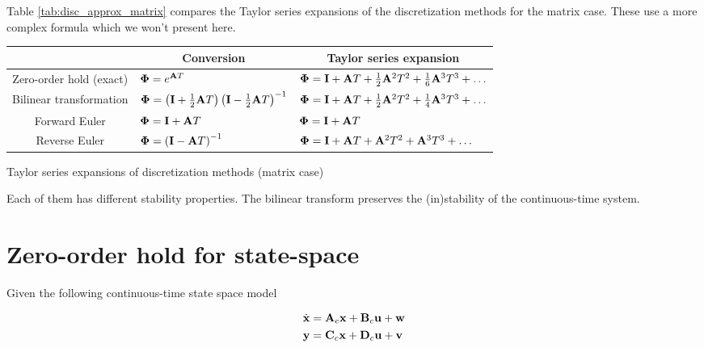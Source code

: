 Table \ref{tab:disc_approx_matrix} compares the Taylor series expansions of the
discretization methods for the matrix case. These use a more complex formula
which we won't present here.

\begin{booktable}
  \begin{tabular}{|cll|}
    \hline
    \rowcolor{headingbg}
    \multicolumn{1}{|c}{\textbf{Discretization method}} &
      \multicolumn{1}{c}{\textbf{Conversion}} &
      \multicolumn{1}{c|}{\textbf{Taylor series expansion}} \\
    \hline
    Zero-order hold (exact) &
      $\mathbf{\Phi} = e^{\mathbf{A}T}$ &
      $\mathbf{\Phi} = \mathbf{I} + \mathbf{A}T + \frac{1}{2}\mathbf{A}^2T^2 +
        \frac{1}{6}\mathbf{A}^3T^3 + \ldots$ \\
    Bilinear transformation &
      $\mathbf{\Phi} =
        \left(\mathbf{I} + \frac{1}{2}\mathbf{A}T\right)
        \left(\mathbf{I} - \frac{1}{2}\mathbf{A}T\right)^{-1}$ &
      $\mathbf{\Phi} = \mathbf{I} + \mathbf{A}T + \frac{1}{2}\mathbf{A}^2T^2 +
        \frac{1}{4}\mathbf{A}^3T^3 + \ldots$ \\
    Forward Euler &
      $\mathbf{\Phi} = \mathbf{I} + \mathbf{A}T$ &
      $\mathbf{\Phi} = \mathbf{I} + \mathbf{A}T$ \\
    Reverse Euler &
      $\mathbf{\Phi} = \left(\mathbf{I} - \mathbf{A}T\right)^{-1}$ &
      $\mathbf{\Phi} =
        \mathbf{I} + \mathbf{A}T + \mathbf{A}^2T^2 + \mathbf{A}^3T^3 + \ldots$ \\
    \hline
  \end{tabular}
  \caption{Taylor series expansions of discretization methods (matrix case)}
  \label{tab:disc_approx_matrix}
\end{booktable}

Each of them has different stability properties. The bilinear transform
preserves the (in)stability of the continuous-time system.

\section{Zero-order hold for state-space}

Given the following continuous-time state space model

\begin{align*}
  \dot{\mathbf{x}} &= \mathbf{A}_c\mathbf{x} + \mathbf{B}_c\mathbf{u} + \mathbf{w} \\
  \mathbf{y} &= \mathbf{C}_c\mathbf{x} + \mathbf{D}_c\mathbf{u} + \mathbf{v}
\end{align*}

